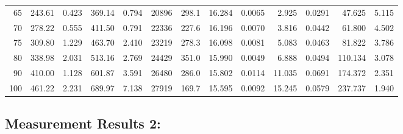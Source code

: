 \documentclass[10pt]{article}
\begin{document}
{\begin{tabular}{|r|rr|rr|rr|rr|rr|r|r|}
       65 &       243.61 &        0.423 &       369.14 &        0.794 &        20896 &        298.1 &       16.284 &       0.0065 &        2.925 &       0.0291 &       47.625 &        5.115 \\
       70 &       278.22 &        0.555 &       411.50 &        0.791 &        22336 &        227.6 &       16.196 &       0.0070 &        3.816 &       0.0442 &       61.800 &        4.502 \\
       75 &       309.80 &        1.229 &       463.70 &        2.410 &        23219 &        278.3 &       16.098 &       0.0081 &        5.083 &       0.0463 &       81.822 &        3.786 \\
       80 &       338.98 &        2.031 &       513.16 &        2.769 &        24429 &        351.0 &       15.990 &       0.0049 &        6.888 &       0.0494 &      110.134 &        3.078 \\
       90 &       410.00 &        1.128 &       601.87 &        3.591 &        26480 &        286.0 &       15.802 &       0.0114 &       11.035 &       0.0691 &      174.372 &        2.351 \\
      100 &       461.22 &        2.231 &       689.97 &        7.138 &        27919 &        169.7 &       15.595 &       0.0092 &       15.245 &       0.0579 &      237.737 &        1.940 \\
\hline
\end{tabular}
}



\subsection*{\large \bf Measurement Results 2:}
\end{document}
